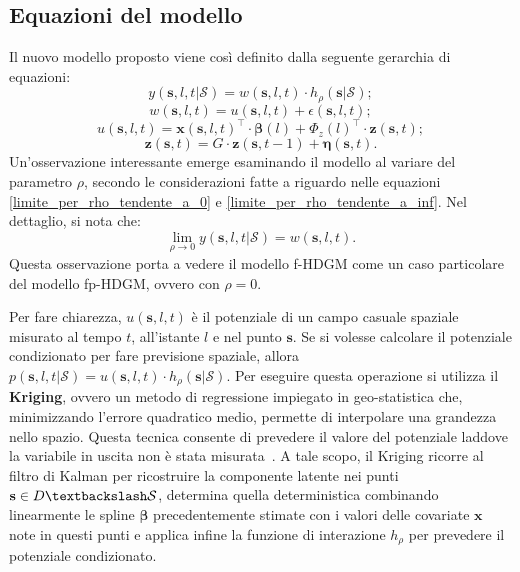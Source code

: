\subsection[Equazioni del modello]{Equazioni del modello}
Il nuovo modello proposto viene così definito dalla seguente gerarchia di equazioni:
\begin{equation}
	y(\mathbf{s}, l, t| \mathcal{S}) = w(\mathbf{s}, l, t)\cdot h_\rho(\mathbf{s}|\mathcal{S});
	\label{eq_rumore_uscita_HDGM}
\end{equation}
\begin{equation}
	w(\mathbf{s}, l, t)= u(\mathbf{s}, l, t) + \epsilon(\mathbf{s}, l, t);
	\label{eq_rumore_uscita_fp_HDGM}
\end{equation}
\begin{equation}
	u(\mathbf{s}, l, t) = \mathbf{x}(\mathbf{s}, l, t)^\top\cdot\boldsymbol{\beta}(l) + \Phi_z(l)^\top\cdot\mathbf{z}(\mathbf{s}, t);
	\label{eq_comp_det_fp-HDGM}
\end{equation}
\begin{equation}
	\mathbf{z}(\mathbf{s}, t) = G\cdot \mathbf{z}(\mathbf{s}, t-1) + \boldsymbol{\eta}(\mathbf{s}, t).
	\label{eq_comp_lat_fp-HDGM}
\end{equation}
Un'osservazione interessante emerge esaminando il modello al variare del parametro $\rho$, secondo le considerazioni fatte a riguardo nelle equazioni \ref{limite_per_rho_tendente_a_0} e \ref{limite_per_rho_tendente_a_inf}. Nel dettaglio, si nota che:
\begin{equation}
	\lim_{\rho \to 0} y(\mathbf{s}, l, t| \mathcal{S}) = w(\mathbf{s}, l, t). \label{limite_geo-potenziale_condizionato_rho_a_0}
\end{equation}
Questa osservazione porta a vedere il modello f-HDGM come un caso particolare del modello fp-HDGM, ovvero con $\rho=0$.
\par Per fare chiarezza, $u(\mathbf{s}, l , t)$ è il potenziale di un campo casuale spaziale misurato al tempo $t$, all'istante $l$ e nel punto $\mathbf{s}$. Se si volesse calcolare il potenziale condizionato per fare previsione spaziale, allora $p(\mathbf{s}, l, t|\mathcal{S}) = u(\mathbf{s}, l , t)\cdot h_\rho(\mathbf{s}| \mathcal{S})$. Per eseguire questa operazione si utilizza il \textbf{Kriging}, ovvero un metodo di regressione impiegato in geo-statistica che, minimizzando l'errore quadratico medio, permette di interpolare una grandezza nello spazio. Questa tecnica consente di prevedere il valore del potenziale laddove la variabile in uscita non è stata misurata~\citep{paper_f_HDGM}. A tale scopo, il Kriging ricorre al filtro di Kalman per ricostruire la componente latente nei punti $\mathbf{s}\in D\textbackslash\mathcal{S}$, determina quella deterministica combinando linearmente le spline $\boldsymbol{\beta}$ precedentemente stimate con i valori delle covariate $\mathbf{x}$ note in questi punti e applica infine la funzione di interazione $h_\rho$ per prevedere il potenziale condizionato.

